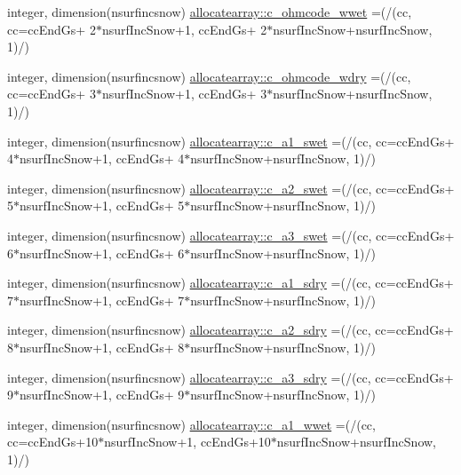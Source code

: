 \begin{DoxyCompactItemize}
\item 
integer, dimension(nsurfincsnow) \hyperlink{namespaceallocatearray_a1333996a9ed29e913c8a79212a5aa7df}{allocatearray\+::c\+\_\+ohmcode\+\_\+wwet} =(/(cc, cc=cc\+End\+Gs+ 2$\ast$nsurf\+Inc\+Snow+1, cc\+End\+Gs+ 2$\ast$nsurf\+Inc\+Snow+nsurf\+Inc\+Snow, 1)/)
\item 
integer, dimension(nsurfincsnow) \hyperlink{namespaceallocatearray_a7021ab6b2b0a892263e2bea80216dd42}{allocatearray\+::c\+\_\+ohmcode\+\_\+wdry} =(/(cc, cc=cc\+End\+Gs+ 3$\ast$nsurf\+Inc\+Snow+1, cc\+End\+Gs+ 3$\ast$nsurf\+Inc\+Snow+nsurf\+Inc\+Snow, 1)/)
\item 
integer, dimension(nsurfincsnow) \hyperlink{namespaceallocatearray_a2af0ac8edfec0bc48cfe96430b85f9af}{allocatearray\+::c\+\_\+a1\+\_\+swet} =(/(cc, cc=cc\+End\+Gs+ 4$\ast$nsurf\+Inc\+Snow+1, cc\+End\+Gs+ 4$\ast$nsurf\+Inc\+Snow+nsurf\+Inc\+Snow, 1)/)
\item 
integer, dimension(nsurfincsnow) \hyperlink{namespaceallocatearray_a23f88d3f042915af31a77a23e34ac954}{allocatearray\+::c\+\_\+a2\+\_\+swet} =(/(cc, cc=cc\+End\+Gs+ 5$\ast$nsurf\+Inc\+Snow+1, cc\+End\+Gs+ 5$\ast$nsurf\+Inc\+Snow+nsurf\+Inc\+Snow, 1)/)
\item 
integer, dimension(nsurfincsnow) \hyperlink{namespaceallocatearray_aa37a60646d2e216c6ef174a9d3d937e0}{allocatearray\+::c\+\_\+a3\+\_\+swet} =(/(cc, cc=cc\+End\+Gs+ 6$\ast$nsurf\+Inc\+Snow+1, cc\+End\+Gs+ 6$\ast$nsurf\+Inc\+Snow+nsurf\+Inc\+Snow, 1)/)
\item 
integer, dimension(nsurfincsnow) \hyperlink{namespaceallocatearray_aeb286eaa02498b48dc4c2ecaf21d7af5}{allocatearray\+::c\+\_\+a1\+\_\+sdry} =(/(cc, cc=cc\+End\+Gs+ 7$\ast$nsurf\+Inc\+Snow+1, cc\+End\+Gs+ 7$\ast$nsurf\+Inc\+Snow+nsurf\+Inc\+Snow, 1)/)
\item 
integer, dimension(nsurfincsnow) \hyperlink{namespaceallocatearray_a3ab2ec26537a6dfb7dd41c567553aa9e}{allocatearray\+::c\+\_\+a2\+\_\+sdry} =(/(cc, cc=cc\+End\+Gs+ 8$\ast$nsurf\+Inc\+Snow+1, cc\+End\+Gs+ 8$\ast$nsurf\+Inc\+Snow+nsurf\+Inc\+Snow, 1)/)
\item 
integer, dimension(nsurfincsnow) \hyperlink{namespaceallocatearray_a61e51307f223225bb90ad6bd605f016f}{allocatearray\+::c\+\_\+a3\+\_\+sdry} =(/(cc, cc=cc\+End\+Gs+ 9$\ast$nsurf\+Inc\+Snow+1, cc\+End\+Gs+ 9$\ast$nsurf\+Inc\+Snow+nsurf\+Inc\+Snow, 1)/)
\item 
integer, dimension(nsurfincsnow) \hyperlink{namespaceallocatearray_a259bdea5ff3b256a8d42eed33dd787f6}{allocatearray\+::c\+\_\+a1\+\_\+wwet} =(/(cc, cc=cc\+End\+Gs+10$\ast$nsurf\+Inc\+Snow+1, cc\+End\+Gs+10$\ast$nsurf\+Inc\+Snow+nsurf\+Inc\+Snow, 1)/)

\end{DoxyCompactItemize}
